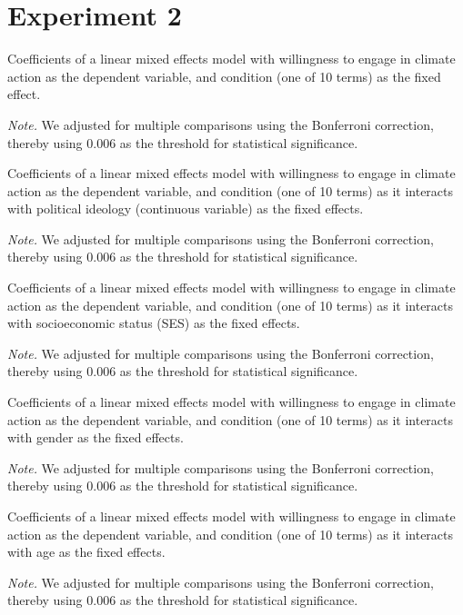     \section{Experiment 2}


\begin{table}[H] 
\caption{Coefficients of a linear mixed effects model with willingness to engage in climate action as the dependent variable, and condition (one of 10 terms) as the fixed effect.}
 
\end{table}
\textit{Note.} We adjusted for multiple comparisons using the Bonferroni correction, thereby using 0.006 as the threshold for statistical significance.

\begin{table}[H] 
\caption{Coefficients of a linear mixed effects model with willingness to engage in climate action as the dependent variable, and condition (one of 10 terms) as it interacts with political ideology (continuous variable) as the fixed effects.}
 
\end{table}
\textit{Note.} We adjusted for multiple comparisons using the Bonferroni correction, thereby using 0.006 as the threshold for statistical significance.

\begin{table}[H] 
\caption{Coefficients of a linear mixed effects model with willingness to engage in climate action as the dependent variable, and condition (one of 10 terms) as it interacts with socioeconomic status (SES) as the fixed effects.}
 
\end{table}
\textit{Note.} We adjusted for multiple comparisons using the Bonferroni correction, thereby using 0.006 as the threshold for statistical significance.

\begin{table}[H] 
\caption{Coefficients of a linear mixed effects model with willingness to engage in climate action as the dependent variable, and condition (one of 10 terms) as it interacts with gender as the fixed effects.}
 
\end{table}
\textit{Note.} We adjusted for multiple comparisons using the Bonferroni correction, thereby using 0.006 as the threshold for statistical significance.

\begin{table}[H] 
\caption{Coefficients of a linear mixed effects model with willingness to engage in climate action as the dependent variable, and condition (one of 10 terms) as it interacts with age as the fixed effects.}
 
\end{table}
\textit{Note.} We adjusted for multiple comparisons using the Bonferroni correction, thereby using 0.006 as the threshold for statistical significance.


